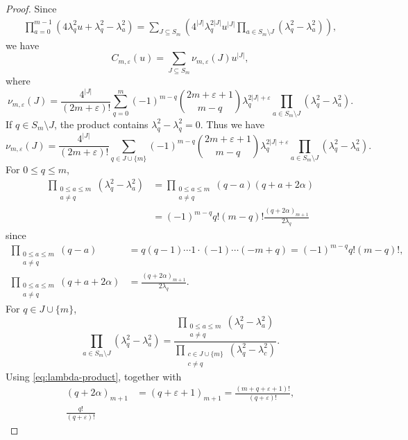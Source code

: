 \documentclass[10pt,a4paper]{amsart}
\theoremstyle{definition}
\begin{document}
\begin{proof}
Since 
\[
\begin{aligned}
\prod_{a=0}^{m-1}
\left(
4\lambda_q^2u+\lambda_q^2-\lambda_a^2
\right)
=
\sum_{J \subseteq S_m} 
\left(
4^{|J|} \lambda_q^{2|J|} u^{|J|}
\prod_{a\in S_m\setminus J}
(\lambda_q^2-\lambda_a^2)
\right),
\end{aligned}
\]
we have
\[
C_{m,\varepsilon}(u)
=
\sum_{J \subseteq S_m} \nu_{m,\varepsilon}(J) 
u^{|J|},
\]
where
\[
\nu_{m,\varepsilon}(J)
=
\frac{4^{|J|}}{(2m+\varepsilon)!}
\sum_{q=0}^{m}
(-1)^{m-q}
\binom{2m+\varepsilon+1}{m-q}
\lambda_q^{2|J|+\varepsilon}
\prod_{a\in S_m\setminus J}
(\lambda_q^2-\lambda_a^2).
\]
If $q\in S_m\setminus J$, the product contains
$\lambda_q^2-\lambda_q^2=0$.  
Thus we have
\[
\nu_{m,\varepsilon}(J)
=
\frac{4^{|J|}}{(2m+\varepsilon)!}
\sum_{q \in J\cup\{m\}}
(-1)^{m-q}
\binom{2m+\varepsilon+1}{m-q}
\lambda_q^{2|J|+\varepsilon}
\prod_{a\in S_m\setminus J}
(\lambda_q^2-\lambda_a^2).
\]
For $0\le q\le m$,
\begin{equation}\label{eq:lambda-product}
\begin{aligned}   
\prod_{\substack{0\le a\le m\\a\ne q}}
(\lambda_q^2-\lambda_a^2)
&=
\prod_{\substack{0\le a\le m\\a\ne q}}
(q-a)(q+a+2\alpha)\\
&=
(-1)^{m-q}q!(m-q)!
\frac{(q+2\alpha)_{m+1}}{2\lambda_q}
\end{aligned}
\end{equation}
since
\[
\begin{aligned}
\prod_{\substack{0\le a\le m\\a\ne q}}(q-a)
&=
q (q-1) \cdots 1 \cdot (-1) \cdots (-m+q) 
=
(-1)^{m-q}q!(m-q)!,\\
\prod_{\substack{0\le a\le m\\a\ne q}}(q+a+2\alpha)
&=
\frac{(q+2\alpha)_{m+1}}{2\lambda_q}.
\end{aligned}
\]
For $q\in J \cup \{m\}$,
\[
\prod_{a\in S_m\setminus J}
(\lambda_q^2-\lambda_a^2)
=
\frac{
\displaystyle
\prod_{\substack{0\le a\le m\\a\ne q}}
(\lambda_q^2-\lambda_a^2)
}{
\displaystyle
\prod_{\substack{c\in  J \cup \{m\}\\c\ne q}}
(\lambda_q^2-\lambda_c^2)
}.
\]
Using \eqref{eq:lambda-product}, together with
\[
\begin{aligned}
(q+2\alpha)_{m+1}
&=
(q+\varepsilon +1)_{m+1}=
\frac{(m+q+\varepsilon+1)!}{(q+\varepsilon)!},\\
\frac{q!}{(q+\varepsilon)!}

\end{aligned}\]
\end{proof}
\end{document}
